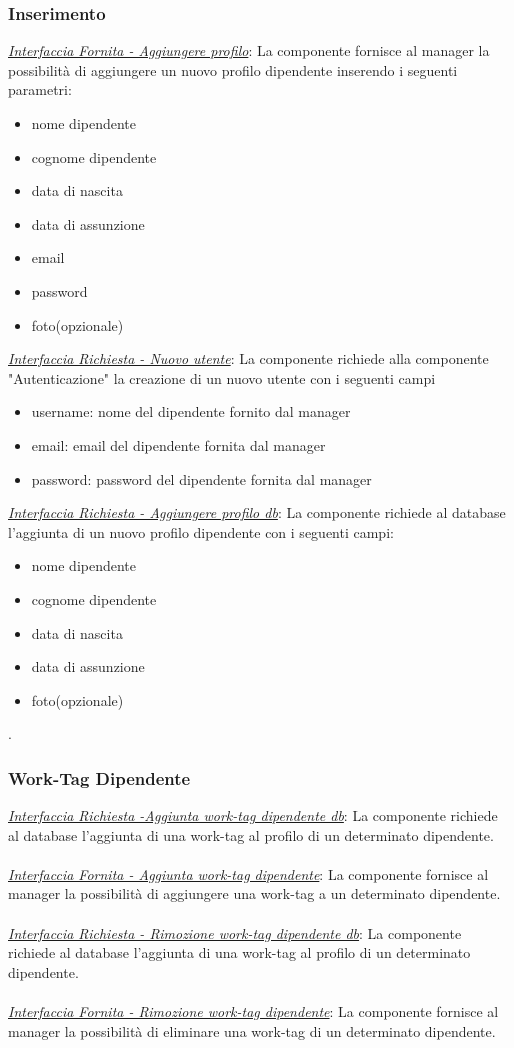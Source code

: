 \documentclass{report}
\begin{document}
\subsubsection*{\indent \indent Inserimento}
\uline{\textit{Interfaccia Fornita - Aggiungere profilo}}:
La componente fornisce al manager la possibilità di aggiungere un nuovo profilo dipendente inserendo i seguenti parametri:
\begin{itemize}
	\item nome dipendente
	\item cognome dipendente
	\item data di nascita
	\item data di assunzione
	\item email 
	\item password
	\item foto(opzionale)
\end{itemize}
\uline{\textit{Interfaccia Richiesta - Nuovo utente}}: 
La componente richiede alla componente "Autenticazione" la creazione di un nuovo utente con i seguenti campi
\begin{itemize}
	\item username: nome del dipendente fornito dal manager
	\item email: email del dipendente fornita dal manager
	\item password: password del dipendente fornita dal manager
\end{itemize}
\textcolor{Database}{\uline{\textit{Interfaccia Richiesta - Aggiungere profilo db}}}:
La componente richiede al database l'aggiunta di un nuovo profilo dipendente con i seguenti campi:
\begin{itemize}
	\item nome dipendente
	\item cognome dipendente
	\item data di nascita
	\item data di assunzione
	\item foto(opzionale)
\end{itemize}.
\subsubsection*{\indent \indent Work-Tag Dipendente}
\textcolor{Database}{\uline{\textit{Interfaccia Richiesta -Aggiunta work-tag dipendente db}}}:
La componente richiede al database l'aggiunta di una work-tag al profilo di un determinato dipendente.\\\\
\uline{\textit{Interfaccia Fornita - Aggiunta work-tag dipendente}}:
La componente fornisce al manager la possibilità di aggiungere una work-tag a un determinato dipendente.\\\\
\textcolor{Database}{\uline{\textit{Interfaccia Richiesta - Rimozione work-tag dipendente db}}}:
La componente richiede al database l'aggiunta di una work-tag al profilo di un determinato dipendente.\\\\
\uline{\textit{Interfaccia Fornita - Rimozione work-tag dipendente}}:
La componente fornisce al manager la possibilità di eliminare una work-tag di un determinato dipendente.
\end{document}
